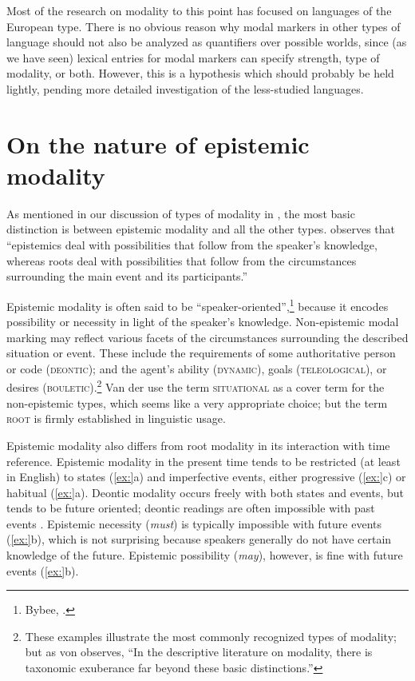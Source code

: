 Most of the research on modality to this point has focused on languages of the European type. There is no obvious reason why modal markers in other types of language should not also be analyzed as quantifiers over possible worlds, since (as we have seen) lexical entries for modal markers can specify strength, type of modality, or both. However, this is a hypothesis which should probably be held lightly, pending more detailed investigation of the less-studied languages.


\section{On the nature of epistemic modality}\label{sec:} %

As mentioned in our discussion of types of modality in , the most basic distinction is between epistemic modality and all the other types. \citet[1486]{Hacquard2011} observes that “epistemics deal with possibilities that follow from the speaker’s knowledge, whereas roots deal with possibilities that follow from the circumstances surrounding the main event and its participants.”



Epistemic modality is often said to be “speaker-oriented”,\footnote{Bybee, \citet{PerkinsPagliuca1994}.} because it encodes possibility or necessity in light of the speaker’s knowledge. Non-epistemic modal marking may reflect various facets of the circumstances surrounding the described situation or event. These include the requirements of some authoritative person or code (\textsc{deontic}); and the agent’s ability (\textsc{dynamic}), goals (\textsc{teleological}), or desires (\textsc{bouletic}).\footnote{These examples illustrate the most commonly recognized types of modality; but as von \citet{Fintel2006} observes, “In the descriptive literature on modality, there is taxonomic exuberance far beyond these basic distinctions.”} Van der \citet{AuweraAmmann2013} use the term \textsc{situational} as a cover term for the non-epistemic types, which seems like a very appropriate choice; but the term \textsc{root} is firmly established in linguistic usage.



Epistemic modality also differs from root modality in its interaction with time reference. Epistemic modality in the present time tends to be restricted (at least in English) to states (\ref{ex:}a) and imperfective events, either progressive (\ref{ex:}c) or habitual (\ref{ex:}a). Deontic modality occurs freely with both states and events, but tends to be future oriented; deontic readings are often impossible with past events . Epistemic necessity (\textit{must}) is typically impossible with future events (\ref{ex:}b), which is not surprising because speakers generally do not have certain knowledge of the future. Epistemic possibility (\textit{may}), however, is fine with future events (\ref{ex:}b). 


